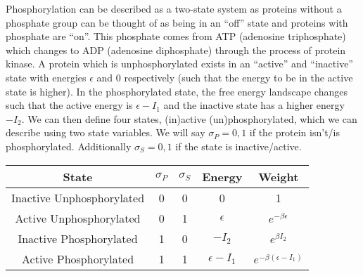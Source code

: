 \documentclass[a4paper,twoside,master.tex]{subfiles}
\begin{document}

\begin{ex}
    Phosphorylation can be described as a two-state system as proteins without a phosphate group can be thought of as being in an ``off'' state and proteins with phosphate are ``on''. This phosphate comes from ATP (adenosine triphosphate) which changes to ADP (adenosine diphosphate) through the process of protein kinase. A protein which is unphosphorylated exists in an ``active'' and ``inactive'' state with energies $ \epsilon $ and $ 0 $ respectively (such that the energy to be in the active state is higher). In the phosphorylated state, the free energy landscape changes such that the active energy is $ \epsilon - I_1 $ and the inactive state has a higher energy $ - I_2 $. We can then define four states, (in)active (un)phosphorylated, which we can describe using two state variables. We will say $ \sigma_P = 0,1 $ if the protein isn't/is phosphorylated. Additionally $ \sigma_S = 0,1 $ if the state is inactive/active.

    \begin{tabular}{@{}ccccc@{}}
        State & $ \sigma_P $ & $ \sigma_S $ & Energy & Weight \\
            \toprule
        Inactive Unphosphorylated & 0 & 0 & 0 & 1\\
        Active Unphosphorylated & 0 & 1 & $ \epsilon $ & $ e^{- \beta \epsilon} $ \\
        Inactive Phosphorylated & 1 & 0 & $ - I_2 $ & $ e^{\beta I_2} $ \\
        Active Phosphorylated & 1 & 1 & $ \epsilon - I_1 $ & $ e^{- \beta (\epsilon - I_1)} $ \\
            \bottomrule
    \end{tabular}


\end{ex}
\end{document}
